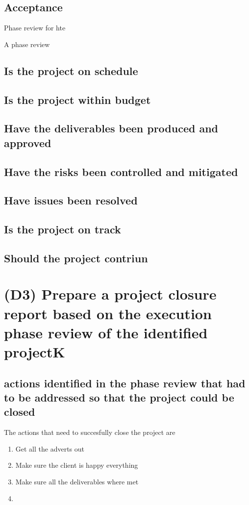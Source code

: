 \documentclass{article}
\begin{document}
\subsection{Acceptance}

Phase review for hte 

A phase review
		\subsection{Is the project on schedule}
		\subsection{Is the project within budget}
		\subsection{Have the deliverables been produced and approved}
		\subsection{Have the risks been controlled and mitigated}
		\subsection{Have issues been resolved}
		\subsection{Is the project on track}
		\subsection{Should the project contriun}


\section{(D3) Prepare a project closure report based on the execution phase review of the identified projectK}

\subsection{actions identified in the phase review that had to be addressed so that the project could be closed}

The actions that need to succesfully close the project are
\begin{enumerate}
	\item Get all the adverts out 
	\item Make sure the client is happy everything
	\item Make sure all the deliverables where met
	\item 
\end{enumerate}
\end{document}
